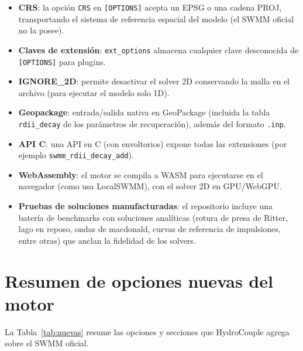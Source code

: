 \documentclass[11pt,a4paper]{article}
\begin{document}
\begin{itemize}[nosep]
  \item \textbf{CRS}: la opción \texttt{CRS} en \texttt{[OPTIONS]} acepta un
        EPSG o una cadena PROJ, transportando el sistema de referencia espacial
        del modelo (el SWMM oficial no la posee).
  \item \textbf{Claves de extensión}: \texttt{ext\_options} almacena
        cualquier clave desconocida de \texttt{[OPTIONS]} para plugins.
  \item \textbf{IGNORE\_2D}: permite desactivar el solver 2D conservando la
        malla en el archivo (para ejecutar el modelo solo 1D).
  \item \textbf{Geopackage}: entrada/salida nativa en GeoPackage
        (incluida la tabla \texttt{rdii\_decay} de los parámetros de
        recuperación), además del formato \texttt{.inp}.
  \item \textbf{API C}: una API en C (con envoltorios) expone todas las
        extensiones (por ejemplo \texttt{swmm\_rdii\_decay\_add}).
  \item \textbf{WebAssembly}: el motor se compila a WASM para ejecutarse en el
        navegador (como usa LocalSWMM), con el solver 2D en GPU/WebGPU.
  \item \textbf{Pruebas de soluciones manufacturadas}: el repositorio incluye
        una batería de benchmarks con soluciones analíticas (rotura de presa
        de Ritter, lago en reposo, ondas de macdonald, curvas de referencia de
        impulsiones, entre otras) que anclan la fidelidad de los solvers.
\end{itemize}

\section{Resumen de opciones nuevas del motor}

La Tabla~\ref{tab:nuevas} resume las opciones y secciones que HydroCouple
agrega sobre el SWMM oficial.
\end{document}
